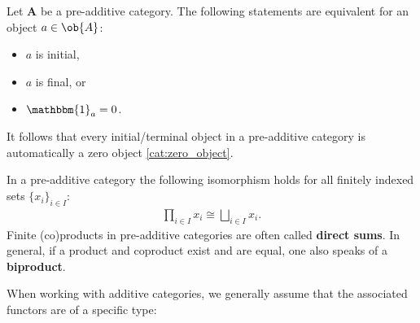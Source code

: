     \begin{property}
        Let $\mathbf{A}$ be a pre-additive category. The following statements are equivalent for an object $a\in\ob{A}$:
        \begin{itemize}
            \item $a$ is initial,
            \item $a$ is final, or
            \item $\mathbbm{1}_a = 0$.
        \end{itemize}
        It follows that every initial/terminal object in a pre-additive category is automatically a zero object \ref{cat:zero_object}.
    \end{property}
    \begin{property}[Biproducts]
        In a pre-additive category the following isomorphism holds for all finitely indexed sets $\{x_i\}_{i\in I}$:
        \begin{gather}
            \prod_{i\in I}x_i \cong \bigsqcup_{i\in I}x_i.
        \end{gather}
        Finite (co)products in pre-additive categories are often called \textbf{direct sums}. In general, if a product and coproduct exist and are equal, one also speaks of a \textbf{biproduct}.
    \end{property}


    When working with additive categories, we generally assume that the associated functors are of a specific type:

